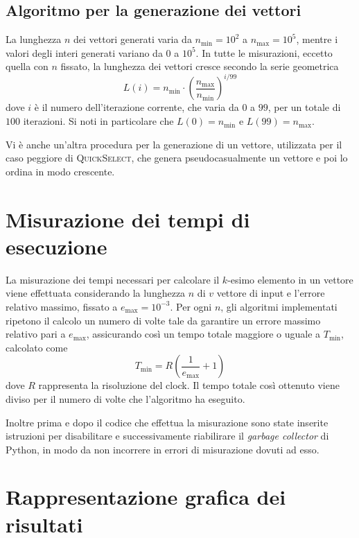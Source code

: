 \documentclass[a4paper,12pt]{article}
\newcommand{\QuickSelect}{\textsc{QuickSelect}}
\begin{document}
\subsection{Algoritmo per la generazione dei vettori}
La lunghezza $n$ dei vettori generati varia da $n_{\min}=10^2$ a $n_{\max}=10^5$, mentre i valori degli interi generati variano da $0$ a $10^5$.
In tutte le misurazioni, eccetto quella con $n$ fissato, la lunghezza dei vettori cresce secondo la serie geometrica
\[
    L(i) = n_{\min} \cdot \left(\frac{n_{\max}}{n_{\min}}\right)^{i/99}
\]
dove $i$ è il numero dell'iterazione corrente, che varia da $0$ a $99$, per un totale di $100$ iterazioni.
Si noti in particolare che $L(0) = n_{\min}$ e $L(99) = n_{\max}$.

Vi è anche un'altra procedura per la generazione di un vettore, utilizzata per il caso peggiore di \QuickSelect{}, che genera pseudocasualmente un vettore e poi lo ordina in modo crescente.


\section{Misurazione dei tempi di esecuzione}
\label{sec:misurazione}
La misurazione dei tempi necessari per calcolare il $k$-esimo elemento in un vettore viene effettuata considerando la lunghezza \( n \) di $v$ vettore di input e l'errore relativo massimo, fissato a $e_{\max} = 10^{-3}$.
Per ogni $n$, gli algoritmi implementati ripetono il calcolo un numero di volte tale da garantire un errore massimo relativo pari a  $e_{\max}$, assicurando così un tempo totale maggiore o uguale a \( T_{\min} \), calcolato come \[ T_{\min} = R \left( \frac{1}{e_{\max}} + 1 \right) \] dove \( R \) rappresenta la risoluzione del clock.
Il tempo totale così ottenuto viene diviso per il numero di volte che l'algoritmo ha eseguito.

Inoltre prima e dopo il codice che effettua la misurazione sono state inserite istruzioni per disabilitare e successivamente riabilirare il \emph{garbage collector} di Python, in modo da non incorrere in errori di misurazione dovuti ad esso.


\newpage

\section{Rappresentazione grafica dei risultati}
\label{sec:grafici}
\end{document}
